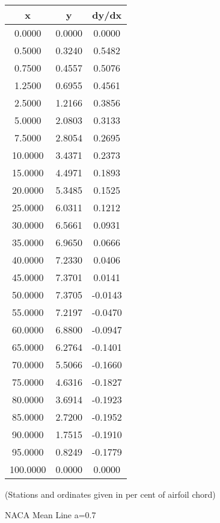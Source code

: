 \documentclass[11pt]{book}
\begin{document}
 \vspace{8mm}
 \begin{tabular}{|c|c|c|}  \hline
 x & y & dy/dx \\
 \hline
0.0000 & 0.0000 & 0.0000 \\
0.5000 & 0.3240 & 0.5482 \\
0.7500 & 0.4557 & 0.5076 \\
1.2500 & 0.6955 & 0.4561 \\
2.5000 & 1.2166 & 0.3856 \\
5.0000 & 2.0803 & 0.3133 \\
7.5000 & 2.8054 & 0.2695 \\
10.0000 & 3.4371 & 0.2373 \\
15.0000 & 4.4971 & 0.1893 \\
20.0000 & 5.3485 & 0.1525 \\
25.0000 & 6.0311 & 0.1212 \\
30.0000 & 6.5661 & 0.0931 \\
35.0000 & 6.9650 & 0.0666 \\
40.0000 & 7.2330 & 0.0406 \\
45.0000 & 7.3701 & 0.0141 \\
50.0000 & 7.3705 & -0.0143 \\
55.0000 & 7.2197 & -0.0470 \\
60.0000 & 6.8800 & -0.0947 \\
65.0000 & 6.2764 & -0.1401 \\
70.0000 & 5.5066 & -0.1660 \\
75.0000 & 4.6316 & -0.1827 \\
80.0000 & 3.6914 & -0.1923 \\
85.0000 & 2.7200 & -0.1952 \\
90.0000 & 1.7515 & -0.1910 \\
95.0000 & 0.8249 & -0.1779 \\
100.0000 & 0.0000 & 0.0000 \\
 \hline
 \end{tabular}
 \vspace{8mm}

(Stations and ordinates given in per cent of airfoil chord)

 \newpage
 \label{mla=0.7}
 \begin{Large}
 NACA Mean Line a=0.7
 \end{Large}
  
\end{document}
